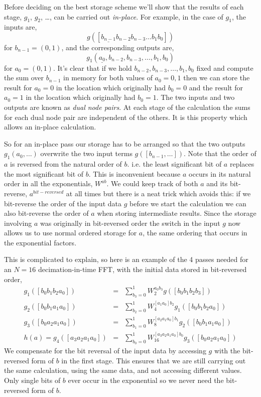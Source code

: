 \documentclass[fleqn,12pt]{article}
\begin{document}
Before deciding on the best storage scheme we'll show that the results
of each stage, $g_1$, $g_2$, \dots, can be carried out {\em
in-place}. For example, in the case of $g_1$, the inputs are,
%
\begin{equation}
g([\underline{b_{n-1}} b_{n-2} b_{n-3} \dots b_1 b_0])
\end{equation}
%
for $b_{n-1}=(0,1)$, and the corresponding outputs are,
%
\begin{equation}
g_1(\underline{a_0},b_{n-2}, b_{n-3}, \dots, b_1, b_0)
\end{equation}
%
for $a_0=(0,1)$.  It's clear that if we hold $b_{n-2}, b_{n-3}, \dots,
b_1, b_0$ fixed and compute the sum over $b_{n-1}$ in memory for both
values of $a_0 = 0,1$ then we can store the result for $a_0=0$ in the
location which originally had $b_0=0$ and the result for $a_0=1$ in
the location which originally had $b_0=1$. The two inputs and two
outputs are known as {\em dual node pairs}. At each stage of the
calculation the sums for each dual node pair are independent of the
others. It is this property which allows an in-place calculation.

So for an in-place pass our storage has to be arranged so that the two
outputs $g_1(a_0,\dots)$ overwrite the two input terms
$g([b_{n-1},\dots])$. Note that the order of $a$ is reversed from the
natural order of $b$. i.e. the least significant bit of $a$
replaces the most significant bit of $b$. This is inconvenient
because $a$ occurs in its natural order in all the exponentials,
$W^{ab}$. We could keep track of both $a$ and its bit-reverse,
$a^{\mathit bit-reversed}$ at all times but there is a neat trick
which avoids this: if we bit-reverse the order of the input data $g$
before we start the calculation we can also bit-reverse the order of
$a$ when storing intermediate results. Since the storage involving $a$
was originally in bit-reversed order the switch in the input $g$ now
allows us to use normal ordered storage for $a$, the same ordering
that occurs in the exponential factors.

This is complicated to explain, so here is an example of the 4 passes
needed for an $N=16$ decimation-in-time FFT, with the initial data
stored in bit-reversed order,
%
\begin{eqnarray}
g_1([b_0 b_1 b_2 a_0]) 
&=& 
\sum_{b_3=0}^{1} W_2^{a_0 b_3} g([b_0 b_1 b_2 b_3])
\\
g_2([b_0 b_1 a_1 a_0]) 
&=& 
\sum_{b_2=0}^{1} W_4^{[a_1 a_0] b_2} g_1([b_0 b_1 b_2 a_0])
\\
g_3([b_0 a_2 a_1 a_0]) 
&=& 
\sum_{b_1=0}^{1} W_8^{[a_2 a_1 a_0] b_1} g_2([b_0 b_1 a_1 a_0])
\\
h(a) = g_4([a_3 a_2 a_1 a_0]) 
&=& 
\sum_{b_0=0}^{1} W_{16}^{[a_3 a_2 a_1 a_0] b_0} g_3([b_0 a_2 a_1 a_0])
\end{eqnarray}
%
We compensate for the bit reversal of the input data by accessing $g$
with the bit-reversed form of $b$ in the first stage. This ensures
that we are still carrying out the same calculation, using the same
data, and not accessing different values. Only single bits of $b$ ever
occur in the exponential so we never need the bit-reversed form of
$b$.
\end{document}
